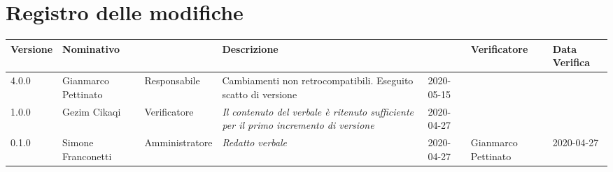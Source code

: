 \section*{Registro delle modifiche}
\renewcommand{\arraystretch}{1.8}

  \setlength\LTleft{-1.7cm}
  \begin{longtable}{|p{1.7cm}|p{2cm}|p{2.5cm}|p{3cm}|p{1.7cm}|p{2cm}|p{2.3cm}|}
    \hline

    \rowcolor{header}
    \textbf{Versione} & \textbf{Nominativo} & \centering{\textbf{Ruolo}} & \textbf{Descrizione} &      \centering{\textbf{Data}} & \textbf{Verificatore} & \textbf{Data Verifica} \\

    \hline
	4.0.0 & Gianmarco Pettinato & Responsabile & Cambiamenti non retrocompatibili.  Eseguito scatto di versione & 2020-05-15 & &\\
    1.0.0 & Gezim Cikaqi & Verificatore & \small{\textit{Il contenuto del verbale è ritenuto sufficiente per il primo incremento di versione}} & 2020-04-27 & &\\
	0.1.0 & Simone Franconetti & Amministratore & \small{\textit{Redatto verbale}} & 2020-04-27 & Gianmarco Pettinato& 2020-04-27\\
    \hline
  \end{longtable}
  \setlength\LTleft{0cm}
